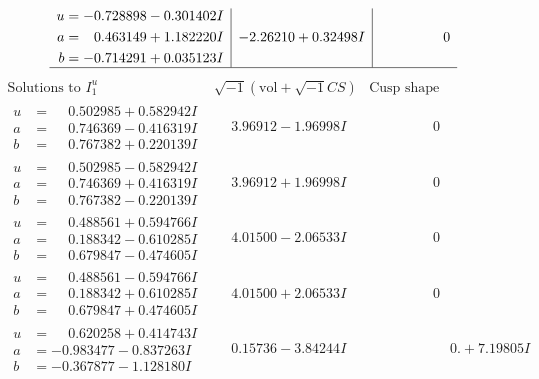 \documentclass[1p]{elsarticle_modified}
\theoremstyle{definition}
\newcommand{\I}{\sqrt{-1}}
\begin{document}
$$\begin{array}{c|c|c}
\begin{aligned}
u &= -0.728898 - 0.301402 I \\
a &= \phantom{-}0.463149 + 1.182220 I \\
b &= -0.714291 + 0.035123 I\end{aligned}
 & -2.26210 + 0.32498 I & \phantom{-0.000000 } 0\\
 \hline 
 \end{array}$$\newpage$$\begin{array}{c|c|c}  
\text{Solutions to }I^u_{1}& \I (\text{vol} + \sqrt{-1}CS) & \text{Cusp shape}\\
 \hline 
\begin{aligned}
u &= \phantom{-}0.502985 + 0.582942 I \\
a &= \phantom{-}0.746369 - 0.416319 I \\
b &= \phantom{-}0.767382 + 0.220139 I\end{aligned}
 & \phantom{-}3.96912 - 1.96998 I & \phantom{-0.000000 } 0 \\ \hline\begin{aligned}
u &= \phantom{-}0.502985 - 0.582942 I \\
a &= \phantom{-}0.746369 + 0.416319 I \\
b &= \phantom{-}0.767382 - 0.220139 I\end{aligned}
 & \phantom{-}3.96912 + 1.96998 I & \phantom{-0.000000 } 0 \\ \hline\begin{aligned}
u &= \phantom{-}0.488561 + 0.594766 I \\
a &= \phantom{-}0.188342 - 0.610285 I \\
b &= \phantom{-}0.679847 - 0.474605 I\end{aligned}
 & \phantom{-}4.01500 - 2.06533 I & \phantom{-0.000000 } 0 \\ \hline\begin{aligned}
u &= \phantom{-}0.488561 - 0.594766 I \\
a &= \phantom{-}0.188342 + 0.610285 I \\
b &= \phantom{-}0.679847 + 0.474605 I\end{aligned}
 & \phantom{-}4.01500 + 2.06533 I & \phantom{-0.000000 } 0 \\ \hline\begin{aligned}
u &= \phantom{-}0.620258 + 0.414743 I \\
a &= -0.983477 - 0.837263 I \\
b &= -0.367877 - 1.128180 I\end{aligned}
 & \phantom{-}0.15736 - 3.84244 I & \phantom{-0.000000 -}0. + 7.19805 I \\ \hline\begin{aligned}

\end{aligned}
\end{array}$$
\end{document}
